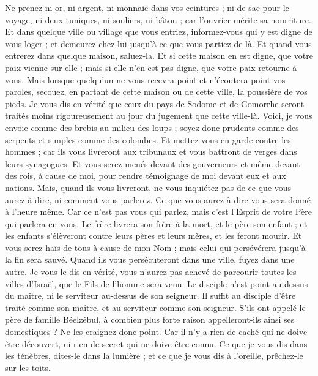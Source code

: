 \begin{multicols}{2}
Ne prenez ni or, ni argent, ni monnaie dans vos ceintures ;
ni de sac pour le voyage, ni deux tuniques, ni souliers, ni bâton ; car l'ouvrier mérite sa nourriture.
Et dans quelque ville ou village que vous entriez, informez-vous qui y est digne de vous loger ; et demeurez chez lui jusqu'à ce que vous partiez de là.
Et quand vous entrerez dans quelque maison, saluez-la.
Et si cette maison en est digne, que votre paix vienne sur elle ; mais si elle n'en est pas digne, que votre paix retourne à vous.
Mais lorsque quelqu'un ne vous recevra point et n'écoutera point vos paroles, secouez, en partant de cette maison ou de cette ville, la poussière de vos pieds.
Je vous dis en vérité que ceux du pays de Sodome et de Gomorrhe seront traités moins rigoureusement au jour du jugement que cette ville-là.
Voici, je vous envoie comme des brebis au milieu des loups ; soyez donc prudents comme des serpents et simples comme des colombes.
Et mettez-vous en garde contre les hommes ; car ils vous livreront aux tribunaux et vous battront de verges dans leurs synagogues.
Et vous serez menés devant des gouverneurs et même devant des rois, à cause de moi, pour rendre témoignage de moi devant eux et aux nations.
Mais, quand ils vous livreront, ne vous inquiétez pas de ce que vous aurez à dire, ni comment vous parlerez. Ce que vous aurez à dire vous sera donné à l'heure même.
Car ce n'est pas vous qui parlez, mais c'est l'Esprit de votre Père qui parlera en vous.
Le frère livrera son frère à la mort, et le père son enfant ; et les enfants s'élèveront contre leurs pères et leurs mères, et les feront mourir.
Et vous serez haïs de tous à cause de mon Nom ; mais celui qui persévérera jusqu'à la fin sera sauvé.
Quand ils vous persécuteront dans une ville, fuyez dans une autre. Je vous le dis en vérité, vous n'aurez pas achevé de parcourir toutes les villes d'Israël, que le Fils de l'homme sera venu.
Le disciple n'est point au-dessus du maître, ni le serviteur au-dessus de son seigneur.
Il suffit au disciple d'être traité comme son maître, et au serviteur comme son seigneur. S'ils ont appelé le père de famille Béelzébul, à combien plus forte raison appelleront-ils ainsi ses domestiques ?
Ne les craignez donc point. Car il n'y a rien de caché qui ne doive être découvert, ni rien de secret qui ne doive être connu.
Ce que je vous dis dans les ténèbres, dites-le dans la lumière ; et ce que je vous dis à l'oreille, prêchez-le sur les toits.

\end{multicols}
